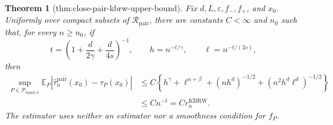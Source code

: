 \documentclass{article}
\newtheorem{theorem}{Theorem}
\begin{document}
\begin{theorem}[thm:close-pair-kbrw-upper-bound]\label{thm:close-pair-kbrw-upper-bound}
Fix \(d,L,\varepsilon,f_-,f_+\), and \(x_0\).  Uniformly over compact
subsets of \(\mathcal R_{\mathrm{pair}}\), there are constants \(C<\infty\)
and \(n_0\) such that, for every \(n\geq n_0\), if
\[
t=\left(1+\frac d{2\gamma}+\frac d{4s}\right)^{-1},
\qquad h=n^{-t/\gamma},\qquad \ell=n^{-t/(2s)},
\]
then
\[
\begin{aligned}
\sup_{P\in\mathcal P_{\mathrm{band},n}}
\mathbb E_P\left|
\widehat\tau_n^{\mathrm{pair}}(x_0)-\tau_P(x_0)
\right|
&\leq C\left\{
h^\gamma+\ell^{\alpha+\beta}
+(nh^d)^{-1/2}+(n^2h^d\ell^d)^{-1/2}
\right\}\\
&\leq C n^{-t}=C r_n^{\mathrm{KBRW}}.
\end{aligned}
\]
The estimator uses neither an estimator nor a smoothness condition for
\(f_P\).
\end{theorem}
\end{document}
